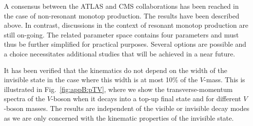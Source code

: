 A consensus between the ATLAS and CMS collaborations has been reached in
the case of non-resonant monotop production. The results have been
described above. In contrast, discussions in the context of resonant
monotop production are still on-going. The related parameter space
contains four parameters and must thus be further simplified for practical
purposes. Several options are possible and a choice necessitates additional
studies that will be achieved in a near future.

It has been verified that the kinematics do not depend on the width of the
invisible state in the case where this width is at most 10\% of the
$V$-mass. This is illustrated in Fig.~\ref{fig:appB:pTV},
where we show the transverse-momentum
spectra of the $V$-boson when it decays into a top-up final state and for
different $V$-boson masses. The results are independent of the
visible or invisible decay modes as we are only concerned with the
kinematic properties of the invisible state.



